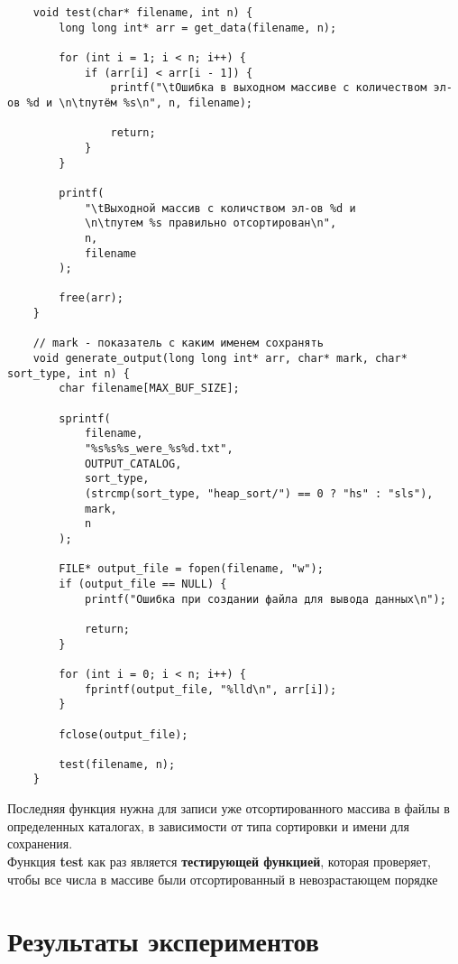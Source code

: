\documentclass[a4paper,12pt,titlepage,finall]{article}
\begin{document}
\begin{verbatim}
    void test(char* filename, int n) {
        long long int* arr = get_data(filename, n);
    
        for (int i = 1; i < n; i++) {
            if (arr[i] < arr[i - 1]) {
                printf("\tОшибка в выходном массиве с количеством эл-ов %d и \n\tпутём %s\n", n, filename);
                
                return;
            }
        }
    
        printf(
            "\tВыходной массив с количством эл-ов %d и
            \n\tпутем %s правильно отсортирован\n", 
            n, 
            filename
        );
    
        free(arr);
    }
    
    // mark - показатель с каким именем сохранять 
    void generate_output(long long int* arr, char* mark, char* sort_type, int n) {
        char filename[MAX_BUF_SIZE];
    
        sprintf(
            filename,
            "%s%s%s_were_%s%d.txt",
            OUTPUT_CATALOG,
            sort_type,
            (strcmp(sort_type, "heap_sort/") == 0 ? "hs" : "sls"),
            mark,
            n
        );
    
        FILE* output_file = fopen(filename, "w");
        if (output_file == NULL) {
            printf("Ошибка при создании файла для вывода данных\n");
    
            return;
        }
    
        for (int i = 0; i < n; i++) {
            fprintf(output_file, "%lld\n", arr[i]);
        }
    
        fclose(output_file);
    
        test(filename, n);
    }
\end{verbatim}

Последняя функция нужна для записи уже отсортированного массива в файлы в определенных каталогах,
в зависимости от типа сортировки и имени для сохранения.\\
Функция \textbf{test} как раз является \textbf{тестирующей функцией}, 
которая проверяет, чтобы все числа в массиве были отсортированный в невозрастающем порядке


\newpage

\section{Результаты экспериментов}
\end{document}

